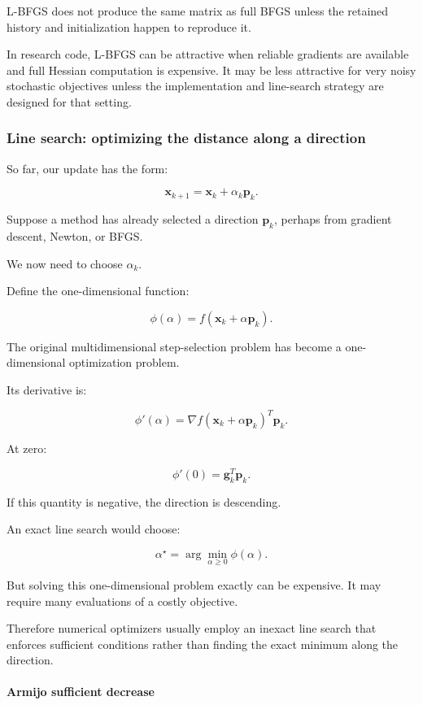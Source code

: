 L-BFGS does not produce the same matrix as full BFGS unless the retained history and initialization happen to reproduce it.

In research code, L-BFGS can be attractive when reliable gradients are available and full Hessian computation is expensive. It may be less attractive for very noisy stochastic objectives unless the implementation and line-search strategy are designed for that setting.

\subsubsection{Line search: optimizing the distance along a direction}\label{02-foundations-ii-ch026-line-search-optimizing-the-distance-along-a-direction}

So far, our update has the form:

\[
\mathbf x_{k+1}=\mathbf x_k+\alpha_k\mathbf p_k.
\]

Suppose a method has already selected a direction \(\mathbf p_k\), perhaps from gradient descent, Newton, or BFGS.

We now need to choose \(\alpha_k\).

Define the one-dimensional function:

\[
\boxed{ \phi(\alpha)=f(\mathbf x_k+\alpha\mathbf p_k) }.
\]

The original multidimensional step-selection problem has become a one-dimensional optimization problem.

Its derivative is:

\[
\phi'(\alpha)= \nabla f(\mathbf x_k+\alpha\mathbf p_k)^T\mathbf p_k.
\]

At zero:

\[
\phi'(0)=\mathbf g_k^T\mathbf p_k.
\]

If this quantity is negative, the direction is descending.

An exact line search would choose:

\[
\alpha^\star=\arg\min_{\alpha\ge0}\phi(\alpha).
\]

But solving this one-dimensional problem exactly can be expensive. It may require many evaluations of a costly objective.

Therefore numerical optimizers usually employ an inexact line search that enforces sufficient conditions rather than finding the exact minimum along the direction.

\paragraph{Armijo sufficient decrease}\label{02-foundations-ii-ch026-armijo-sufficient-decrease}

